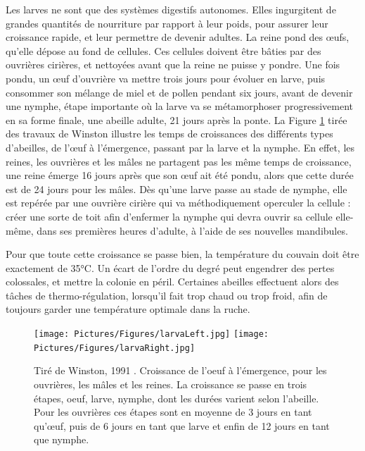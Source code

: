 			Les larves ne sont que des systèmes digestifs autonomes. Elles ingurgitent de grandes quantités de nourriture par rapport à leur poids, pour assurer leur croissance rapide, et leur permettre de devenir adultes. La reine pond des œufs, qu'elle dépose au fond de cellules. Ces cellules doivent être bâties par des ouvrières cirières, et nettoyées avant que la reine ne puisse y pondre. Une fois pondu, un œuf d'ouvrière va mettre trois jours pour évoluer en larve, puis consommer son mélange de miel et de pollen pendant six jours, avant de devenir une nymphe, étape importante où la larve va se métamorphoser progressivement en sa forme finale, une abeille adulte, 21 jours après la ponte. La Figure \ref{LarvaDev} tirée des travaux de Winston \cite{winston_biology_1991} illustre les temps de croissances des différents types d'abeilles, de l'œuf à l'émergence, passant par la larve et la nymphe. En effet, les reines, les ouvrières et les mâles ne partagent pas les même temps de croissance, une reine émerge 16 jours après que son œuf ait été pondu, alors que cette durée est de 24 jours pour les mâles. Dès qu'une larve passe au stade de nymphe, elle est repérée par une ouvrière cirière qui va méthodiquement operculer la cellule : créer une sorte de toit afin d'enfermer la nymphe qui devra ouvrir sa cellule elle-même, dans ses premières heures d'adulte, à l'aide de ses nouvelles mandibules.
			
			Pour que toute cette croissance se passe bien, la température du couvain doit être exactement de 35°C. Un écart de l'ordre du degré peut engendrer des pertes colossales, et mettre la colonie en péril. Certaines abeilles effectuent alors des tâches de thermo-régulation, lorsqu'il fait trop chaud ou trop froid, afin de toujours garder une température optimale dans la ruche.
			
			\begin{figure}
			\centering
			\texttt{[image: Pictures/Figures/larvaLeft.jpg]}
			\texttt{[image: Pictures/Figures/larvaRight.jpg]}
			\caption[Tirée de Winston, 1991 \cite{winston_biology_1991}. Croissance de l'oeuf à l'émergence, pour les ouvrières, les mâles et les reines.]{Tiré de Winston, 1991 \cite{winston_biology_1991}. Croissance de l'oeuf à l'émergence, pour les ouvrières, les mâles et les reines. La croissance se passe en trois étapes, oeuf, larve, nymphe, dont les durées varient selon l'abeille. Pour les ouvrières ces étapes sont en moyenne de 3 jours en tant qu'œuf, puis de 6 jours en tant que larve et enfin de 12 jours en tant que nymphe.}
			\label{LarvaDev}
			\end{figure}

